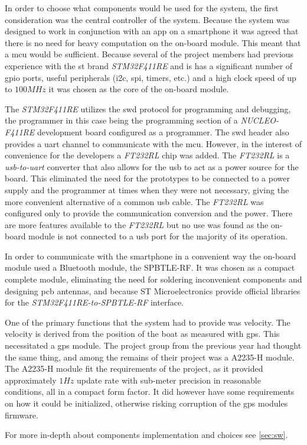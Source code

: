 In order to choose what components would be used for the system, the first consideration was the central controller of the system. Because the system was designed to work in conjunction with an app on a smartphone it was agreed that there is no need for heavy computation on the on-board module. This meant that a \gls{mcu} would be sufficient. Because several of the project members had previous experience with the \gls{st} brand \emph{STM32F411RE} and is has a significant number of \gls{gpio} ports, useful peripherals (\gls{i2c}, \gls{spi}, timers, etc.) and a high clock speed of up to $100MHz$ it was chosen as the core of the on-board module. 

The \emph{STM32F411RE} utilizes the \gls{swd} protocol for programming and debugging, the programmer in this case being the programming section of a \emph{NUCLEO-F411RE} development board configured as a programmer. The \gls{swd} header also provides a \gls{uart} channel to communicate with the \gls{mcu}. However, in the interest of convenience for the developers a \emph{FT232RL} chip was added. The \emph{FT232RL} is a \emph{\gls{usb}-to-\gls{uart}} converter that also allows for the \gls{usb} to act as a power source for the board. This eliminated the need for the prototypes to be connected to a power supply and the programmer at times when they were not necessary, giving the more convenient alternative of a common \gls{usb} cable.  The \emph{FT232RL} was configured only to provide the communication conversion and the power. There are more features available to the \emph{FT232RL} but no use was found as the on-board module is not connected to a \gls{usb} port for the majority of its operation. 

In order to communicate with the smartphone in a convenient way the on-board module used a Bluetooth module, the SPBTLE-RF. It was chosen as a compact complete module, eliminating the need for soldering inconvenient components and designing \gls{pcb} antennas, and because ST Microelectronics provide official libraries for the \emph{STM32F411RE-to-SPBTLE-RF} interface. 

One of the primary functions that the system had to provide was velocity. The velocity is derived from the position of the boat as measured with \gls{gps}. This necessitated a \gls{gps} module. The project group from the previous year had thought the same thing, and among the remains of their project was a A2235-H module. The A2235-H module fit the requirements of the project, as it provided approximately $1Hz$ update rate with sub-meter precision in reasonable conditions, all in a compact form factor. It did however have some requirements on how it could be initialized, otherwise risking corruption of the \gls{gps} modules firmware. 

For more in-depth about components implementation and choices see \autoref{sec:sw}.

